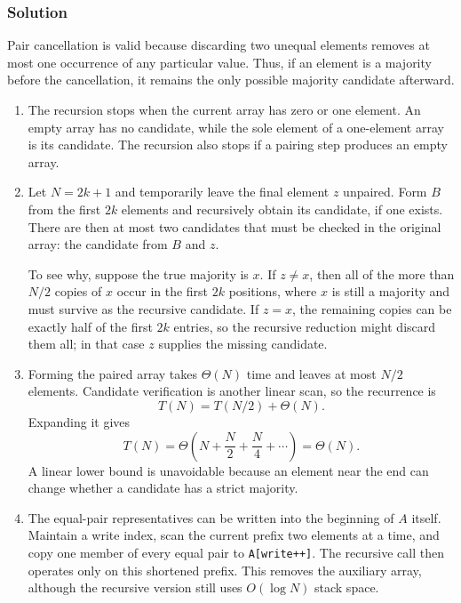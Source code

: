 \documentclass[12pt,a4paper]{article}
\begin{document}
\subsubsection*{\color{sectionnavy}Solution}

Pair cancellation is valid because discarding two unequal elements
removes at most one occurrence of any particular value. Thus, if an
element is a majority before the cancellation, it remains the only
possible majority candidate afterward.

\begin{enumerate}
  \renewcommand{\labelenumi}{\alph{enumi}.}

  \item The recursion stops when the current array has zero or one
  element. An empty array has no candidate, while the sole element of a
  one-element array is its candidate. The recursion also stops if a
  pairing step produces an empty array.

  \item Let $N=2k+1$ and temporarily leave the final element $z$
  unpaired. Form $B$ from the first $2k$ elements and recursively obtain
  its candidate, if one exists. There are then at most two candidates
  that must be checked in the original array: the candidate from $B$
  and $z$.

  To see why, suppose the true majority is $x$. If $z\neq x$, then all
  of the more than $N/2$ copies of $x$ occur in the first $2k$
  positions, where $x$ is still a majority and must survive as the
  recursive candidate. If $z=x$, the remaining copies can be exactly
  half of the first $2k$ entries, so the recursive reduction might
  discard them all; in that case $z$ supplies the missing candidate.

  \item Forming the paired array takes $\Theta(N)$ time and leaves at
  most $N/2$ elements. Candidate verification is another linear scan,
  so the recurrence is
  \[
  T(N)=T(N/2)+\Theta(N).
  \]
  Expanding it gives
  \[
  T(N)=\Theta\left(N+\frac N2+\frac N4+\cdots\right)
      =\boxed{\Theta(N)}.
  \]
  A linear lower bound is unavoidable because an element near the end
  can change whether a candidate has a strict majority.

  \item The equal-pair representatives can be written into the
  beginning of $A$ itself. Maintain a write index, scan the current
  prefix two elements at a time, and copy one member of every equal pair
  to \texttt{A[write++]}. The recursive call then operates only on this
  shortened prefix. This removes the auxiliary array, although the
  recursive version still uses $O(\log N)$ stack space.


\end{enumerate}
\end{document}
